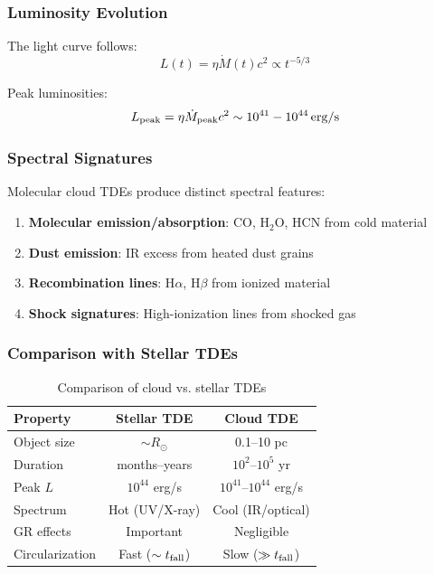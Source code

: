 \documentclass[twocolumn,amsmath,amssymb,prd,superscriptaddress,nofootinbib]{revtex4-2}
\begin{document}
\subsubsection{Luminosity Evolution}

The light curve follows:
\begin{equation}
    L(t) = \eta \dot{M}(t) c^2 \propto t^{-5/3}
    \label{eq:light_curve}
\end{equation}

Peak luminosities:
\begin{equation}
    L_{\rm peak} = \eta \dot{M}_{\rm peak} c^2 \sim 10^{41} - 10^{44}\,{\rm erg/s}
\end{equation}

\subsubsection{Spectral Signatures}

Molecular cloud TDEs produce distinct spectral features:
\begin{enumerate}
    \item \textbf{Molecular emission/absorption}: CO, H$_2$O, HCN from cold material
    \item \textbf{Dust emission}: IR excess from heated dust grains
    \item \textbf{Recombination lines}: H$\alpha$, H$\beta$ from ionized material
    \item \textbf{Shock signatures}: High-ionization lines from shocked gas
\end{enumerate}

\subsubsection{Comparison with Stellar TDEs}

\begin{table}[h]
\centering
\caption{Comparison of cloud vs. stellar TDEs}
\label{tab:comparison}
\begin{tabular}{lcc}
\toprule
Property & Stellar TDE & Cloud TDE \\
\midrule
Object size & $\sim R_\odot$ & 0.1--10 pc \\
Duration & months--years & $10^2$--$10^5$ yr \\
Peak $L$ & $10^{44}$ erg/s & $10^{41}$--$10^{44}$ erg/s \\
Spectrum & Hot (UV/X-ray) & Cool (IR/optical) \\
GR effects & Important & Negligible \\
Circularization & Fast ($\sim t_{\rm fall}$) & Slow ($\gg t_{\rm fall}$) \\
\bottomrule
\end{tabular}
\end{table}
\end{document}
